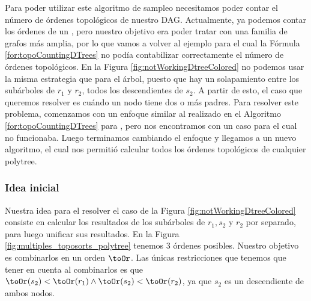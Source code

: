 Para poder utilizar este algoritmo de sampleo necesitamos poder contar el número de órdenes topológicos de nuestro DAG. Actualmente, ya podemos contar los órdenes de un \dtree{}, pero nuestro objetivo era poder tratar con una familia de grafos más amplia, por lo que vamos a volver al ejemplo para el cual la Fórmula \ref{for:topoCountingDTrees} no podía contabilizar correctamente el número de órdenes topológicos. En la Figura \ref{fig:notWorkingDtreeColored} no podemos usar la misma estrategia que para el árbol, puesto que hay un solapamiento entre los subárboles de $r_1$ y $r_2$, todos los descendientes de $s_2$. A partir de esto, el caso que queremos resolver es cuándo un nodo tiene dos o más padres. Para resolver este problema, comenzamos con un enfoque similar al realizado en el Algoritmo \ref{for:topoCountingDTrees} para \dtrees, pero nos encontramos con un caso para el cual no funcionaba. Luego terminamos cambiando el enfoque y llegamos a un nuevo algoritmo, el cual nos permitió calcular todos los órdenes topológicos de cualquier polytree.   

\subsubsection{Idea inicial}

Nuestra idea para el resolver el caso de la Figura \ref{fig:notWorkingDtreeColored} consiste en calcular los resultados de los subárboles de $r_1,s_2$ y  $r_2$ por separado, para luego unificar sus resultados. En la Figura \ref{fig:multiples_toposorts_polytree} tenemos 3 órdenes posibles. Nuestro objetivo es combinarlos en un orden $\toOr$. Las únicas restricciones que tenemos que tener en cuenta al combinarlos es que $\toOr(s_2) < \toOr(r_1) \land \toOr(s_2) < \toOr(r_2)$, ya que $s_2$ es un descendiente de ambos nodos. 

